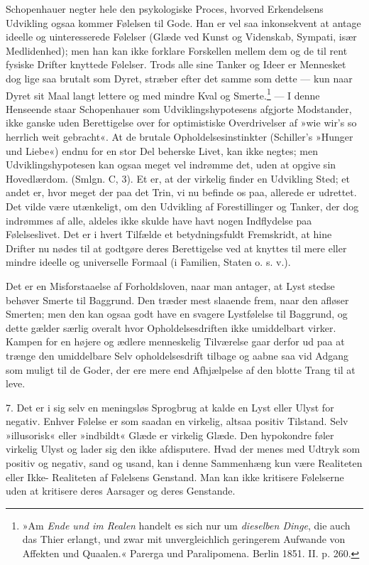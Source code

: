 \documentclass[12pt,a4paper,openany]{book}
\newcommand{\opage}[1]{\marginnote{\footnotesize\textit{[#1]}}}
\begin{document}
Schopenhauer negter hele den psykologiske Proces, hvorved Erkendelsens
Udvikling ogsaa kommer Følelsen til Gode. Han er vel saa inkonsekvent at
antage ideelle og uinteresserede Følelser (Glæde ved Kunst og Videnskab,
Sympati, især Medlidenhed); men han kan ikke forklare Forskellen mellem
dem og de til rent fysiske Drifter knyttede Følelser. Trods alle sine
Tanker og Ideer er Mennesket dog lige saa brutalt som Dyret, stræber
efter det samme som dette --- kun naar Dyret sit Maal langt lettere og
med mindre Kval og Smerte.\footnote[1]{»Am \emph{Ende und im Realen}
handelt es sich nur um \emph{dieselben Dinge}, die auch das Thier
erlangt, und zwar mit unvergleichlich geringerem Aufwande von Affekten
und Quaalen.« Parerga und Paralipomena. Berlin 1851. II. p. 260.} --- I
denne Henseende staar Schopenhauer som Udviklingshypotesens afgjorte
Modstander, ikke ganske uden Berettigelse over for optimistiske
Overdrivelser af »wie wir’s so herrlich weit gebracht«. At de brutale
Opholdelsesinstinkter (Schiller’s »Hunger und Liebe«) endnu for en stor
Del beherske Livet, kan ikke negtes; men Udviklingshypotesen kan ogsaa
meget vel indrømme det, uden at opgive sin Hovedlærdom. (Smlgn. C, 3).
Et er, at der virkelig finder en Udvikling Sted; et andet er, hvor meget
der paa det Trin, vi nu befinde os paa, allerede er udrettet. Det vilde
være utænkeligt, om den Udvikling af Forestillinger og Tanker, der dog
indrømmes af alle, aldeles ikke skulde have havt nogen Indflydelse paa
Følelseslivet. Det er i hvert Tilfælde et betydningsfuldt Fremskridt, at
hine Drifter nu nødes til at godtgøre deres Berettigelse ved at knyttes
til mere eller mindre ideelle og universelle Formaal (i Familien, Staten
o. s. v.).

Det er en Misforstaaelse af Forholdsloven, naar man antager, at Lyst
stedse behøver Smerte til Baggrund. Den træder mest slaaende frem, naar
den afløser Smerten; men den kan ogsaa godt have en svagere Lystfølelse
til Baggrund, og dette gælder særlig overalt hvor Opholdelsesdriften
ikke umiddelbart virker. Kampen for en højere og ædlere menneskelig
Tilværelse gaar derfor ud paa at trænge den umiddelbare Selv%
\opage{339}opholdelsesdrift tilbage og aabne saa vid Adgang som muligt
til de Goder, der ere mere end Afhjælpelse af den blotte Trang til at
leve.

7. Det er i sig selv en meningsløs Sprogbrug at kalde en Lyst eller
Ulyst for negativ. Enhver Følelse er som saadan en virkelig, altsaa
positiv Tilstand. Selv »illusorisk« eller »indbildt« Glæde er virkelig
Glæde. Den hypokondre føler virkelig Ulyst og lader sig den ikke
afdisputere. Hvad der menes med Udtryk som positiv og negativ, sand og
usand, kan i denne Sammenhæng kun være Realiteten eller Ikke- Realiteten
af Følelsens Genstand. Man kan ikke kritisere Følelserne uden at
kritisere deres Aarsager og deres Genstande.
\end{document}
